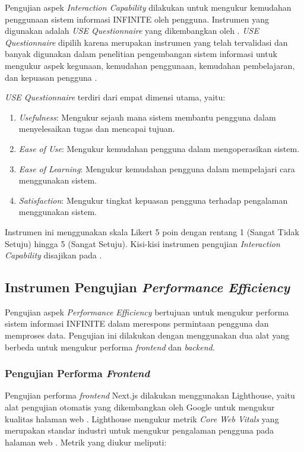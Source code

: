 Pengujian aspek \textit{Interaction Capability} dilakukan untuk mengukur kemudahan penggunaan sistem informasi INFINITE oleh pengguna. Instrumen yang digunakan adalah \textit{USE Questionnaire} yang dikembangkan oleh \citet{Lund_2001_USE}. \textit{USE Questionnaire} dipilih karena merupakan instrumen yang telah tervalidasi dan banyak digunakan dalam penelitian pengembangan sistem informasi untuk mengukur aspek kegunaan, kemudahan penggunaan, kemudahan pembelajaran, dan kepuasan pengguna \citep{Ghaffur_2017_USEQuestionnaire, Jayanto_2017_ISO25010Mobile}.

\textit{USE Questionnaire} terdiri dari empat dimensi utama, yaitu:
\begin{enumerate}[label=\alph*.]
	\item \textit{Usefulness}: Mengukur sejauh mana sistem membantu pengguna dalam menyelesaikan tugas dan mencapai tujuan.
	\item \textit{Ease of Use}: Mengukur kemudahan pengguna dalam mengoperasikan sistem.
	\item \textit{Ease of Learning}: Mengukur kemudahan pengguna dalam mempelajari cara menggunakan sistem.
	\item \textit{Satisfaction}: Mengukur tingkat kepuasan pengguna terhadap pengalaman menggunakan sistem.
\end{enumerate}

Instrumen ini menggunakan skala Likert 5 poin dengan rentang 1 (Sangat Tidak Setuju) hingga 5 (Sangat Setuju). Kisi-kisi instrumen pengujian \textit{Interaction Capability} disajikan pada .

\subsection{Instrumen Pengujian \textit{Performance Efficiency}}

Pengujian aspek \textit{Performance Efficiency} bertujuan untuk mengukur performa sistem informasi INFINITE dalam merespons permintaan pengguna dan memproses data. Pengujian ini dilakukan dengan menggunakan dua alat yang berbeda untuk mengukur performa \textit{frontend} dan \textit{backend}.

\subsubsection{Pengujian Performa \textit{Frontend}}

Pengujian performa \textit{frontend} Next.js dilakukan menggunakan Lighthouse, yaitu alat pengujian otomatis yang dikembangkan oleh Google untuk mengukur kualitas halaman web \citep{Google_2026_Lighthouse}. Lighthouse mengukur metrik \textit{Core Web Vitals} yang merupakan standar industri untuk mengukur pengalaman pengguna pada halaman web \citep{Google_2026_WebVitals}. Metrik yang diukur meliputi:

